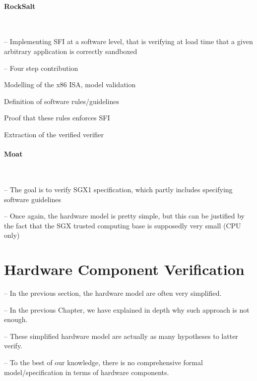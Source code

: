 \paragraph{RockSalt}\,\cite{morrisett2012rocksalt}
%
\begin{compactitem}
\item[--] Implementing SFI at a software level, that is verifying at load time
  that a given arbitrary application is correctly sandboxed
\item[--] Four step contribution
  \begin{compactenum}
  \item Modelling of the x86 ISA, model validation
  \item Definition of software rules/guidelines
  \item Proof that these rules enforces SFI
  \item Extraction of the verified verifier
  \end{compactenum}
\end{compactitem}

\paragraph{Moat}\,\cite{sinha2015moat}
%
\begin{compactitem}
\item[--] The goal is to verify SGX1 specification, which partly includes
  specifying software guidelines
\item[--] Once again, the hardware model is pretty simple, but this can be
  justified by the fact that the SGX trusted computing base is supposedly very
  small (CPU only)
\end{compactitem}

\section{Hardware Component Verification} %
\label{sec:relatedwork:hardware}

\begin{compactitem}
\item[--] In the previous section, the hardware model are often very simplified.
\item[--] In the previous Chapter, we have explained in depth why such approach
  is not enough.
\item[--] These simplified hardware model are actually as many hypotheses to
  latter verify.
\item[--] To the best of our knowledge, there is no comprehensive formal
  model/specification in terms of hardware components.
\end{compactitem}

